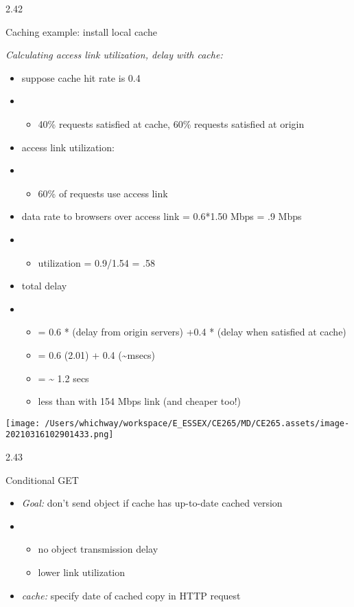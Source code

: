 \documentclass[
]{article}
\begin{document}
2.42

Caching example: install local cache

\emph{Calculating access link utilization, delay with cache:}

\begin{itemize}
\item
  suppose cache hit rate is 0.4
\item
  \begin{itemize}
  \item
    40\% requests satisfied at cache, 60\% requests satisfied at origin
  \end{itemize}
\end{itemize}

\begin{itemize}
\item
  access link utilization:
\item
  \begin{itemize}
  \item
    60\% of requests use access link
  \end{itemize}
\item
  data rate to browsers over access link = 0.6*1.50 Mbps = .9 Mbps
\item
  \begin{itemize}
  \item
    utilization = 0.9/1.54 = .58
  \end{itemize}
\end{itemize}

\begin{itemize}
\item
  total delay
\item
  \begin{itemize}
  \item
    = 0.6 * (delay from origin servers) +0.4 * (delay when satisfied at
    cache)
  \item
    = 0.6 (2.01) + 0.4 (\textasciitilde msecs)
  \item
    = \textasciitilde{} 1.2 secs
  \item
    less than with 154 Mbps link (and cheaper too!)
  \end{itemize}
\end{itemize}

\texttt{[image: /Users/whichway/workspace/E\_ESSEX/CE265/MD/CE265.assets/image-20210316102901433.png]}

2.43

Conditional GET

\begin{itemize}
\item
  \emph{Goal:} don't send object if cache has up-to-date cached version
\item
  \begin{itemize}
  \item
    no object transmission delay
  \item
    lower link utilization
  \end{itemize}
\item
  \emph{cache:} specify date of cached copy in HTTP request
\end{itemize}
\end{document}
